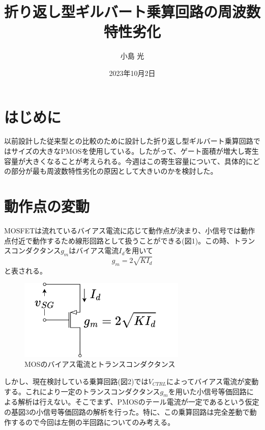 \documentclass[twocolumn]{jsarticle}
\begin{document}
\title{折り返し型ギルバート乗算回路の周波数特性劣化}
\author{小島 光}
\date{2023年10月2日}
\maketitle

\section{はじめに}
以前設計した従来型との比較のために設計した折り返し型ギルバート乗算回路ではサイズの大きなPMOSを使用している。したがって、ゲート面積が増大し寄生容量が大きくなることが考えられる。今週はこの寄生容量について、具体的にどの部分が最も周波数特性劣化の原因として大きいのかを検討した。

\section{動作点の変動}
MOSFETは流れているバイアス電流に応じて動作点が決まり、小信号では動作点付近で動作するため線形回路として扱うことができる(図1)。この時、トランスコンダクタンス$g_{m}$はバイアス電流$I_{d}$を用いて
\begin{equation}
    g_{m}=2\sqrt{KI_{d}}
\end{equation}
と表される。\par

\begin{figure}[b]
\includegraphics*[width=80mm]{figures/gm.png}
\caption{MOSのバイアス電流とトランスコンダクタンス}
\end{figure}


しかし、現在検討している乗算回路(図2)では$V_{CTRL}$によってバイアス電流が変動する。これにより一定のトランスコンダクタンス$g_{m}$を用いた小信号等価回路による解析は行えない。そこでまず、PMOSのテール電流が一定であるという仮定の基図3の小信号等価回路の解析を行った。特に、この乗算回路は完全差動で動作するので今回は左側の半回路についてのみ考える。
\end{document}
